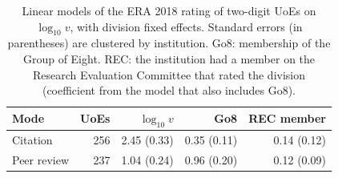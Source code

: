 \begin{table}[htbp]
\centering
\small
\caption{Linear models of the ERA 2018 rating of two-digit UoEs on $\log_{10} v$, with division
fixed effects. Standard errors (in parentheses) are clustered by institution. Go8: membership of
the Group of Eight. REC: the institution had a member on the Research Evaluation Committee that
rated the division (coefficient from the model that also includes Go8).}
\label{tab:era_premium}
\begin{tabular}{lrrrr}
\toprule
Mode & UoEs & $\log_{10} v$ & Go8 & REC member \\
\midrule
Citation & 256 & 2.45 (0.33) & 0.35 (0.11) & 0.14 (0.12) \\
Peer review & 237 & 1.04 (0.24) & 0.96 (0.20) & 0.12 (0.09) \\
\bottomrule
\end{tabular}
\end{table}
